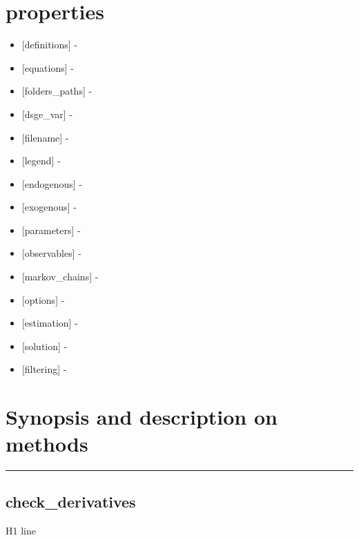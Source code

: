 \documentclass[letterpaper,10pt,english]{sphinxmanual}
\begin{document}
\section{properties}
\label{classes/models/@dsge/dsge:properties}\begin{itemize}
\item {} 
{[}definitions{]} -

\item {} 
{[}equations{]} -

\item {} 
{[}folders\_paths{]} -

\item {} 
{[}dsge\_var{]} -

\item {} 
{[}filename{]} -

\item {} 
{[}legend{]} -

\item {} 
{[}endogenous{]} -

\item {} 
{[}exogenous{]} -

\item {} 
{[}parameters{]} -

\item {} 
{[}observables{]} -

\item {} 
{[}markov\_chains{]} -

\item {} 
{[}options{]} -

\item {} 
{[}estimation{]} -

\item {} 
{[}solution{]} -

\item {} 
{[}filtering{]} -

\end{itemize}


\section{Synopsis and description on methods}
\label{classes/models/@dsge/dsge:synopsis-and-description-on-methods}

\bigskip\hrule{}\bigskip



\subsection{check\_derivatives}
\label{classes/models/@dsge/dsge:check-derivatives}\label{classes/models/@dsge/dsge:id1}
H1 line
\end{document}
